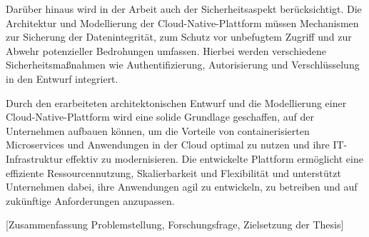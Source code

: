 Darüber hinaus wird in der Arbeit auch der Sicherheitsaspekt berücksichtigt. Die Architektur und Modellierung der Cloud-Native-Plattform müssen Mechanismen zur Sicherung der Datenintegrität, zum Schutz vor unbefugtem Zugriff und zur Abwehr potenzieller Bedrohungen umfassen. Hierbei werden verschiedene Sicherheitsmaßnahmen wie Authentifizierung, Autorisierung und Verschlüsselung in den Entwurf integriert.

Durch den erarbeiteten architektonischen Entwurf und die Modellierung einer Cloud-Native-Plattform wird eine solide Grundlage geschaffen, auf der Unternehmen aufbauen können, um die Vorteile von containerisierten Microservices und Anwendungen in der Cloud optimal zu nutzen und ihre IT-Infrastruktur effektiv zu modernisieren. Die entwickelte Plattform ermöglicht eine effiziente Ressourcennutzung, Skalierbarkeit und Flexibilität und unterstützt Unternehmen dabei, ihre Anwendungen agil zu entwickeln, zu betreiben und auf zukünftige Anforderungen anzupassen.

[Zusammenfassung Problemstellung, Forschungsfrage, Zielsetzung der Thesis]

